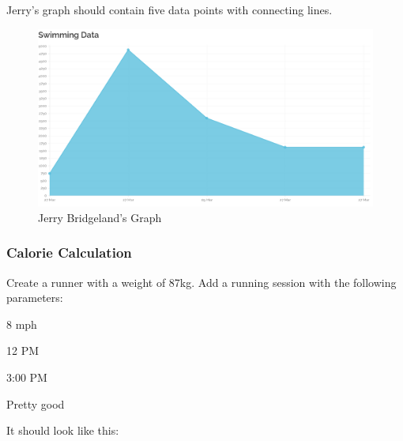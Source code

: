 \documentclass{article}[12pt,a4paper]
\begin{document}
{Jerry's graph should contain five data points with connecting lines.

\begin{figure}[h!]
    \includegraphics[scale=0.3]{images/testing/graphs/jerry}
    \caption{Jerry Bridgeland's Graph}
\end{figure}

\clearpage

\subsubsection{Calorie Calculation}
Create a runner with a weight of 87kg. Add a running session with the following parameters:

\begin{description}[labelindent=1cm]
  \item[Speed:] 8 mph
  \item[Start time:] 12 PM
  \item[Finish time:] 3:00 PM
  \item[Rating:] Pretty good
\end{description}

It should look like this:

}
\end{document}
